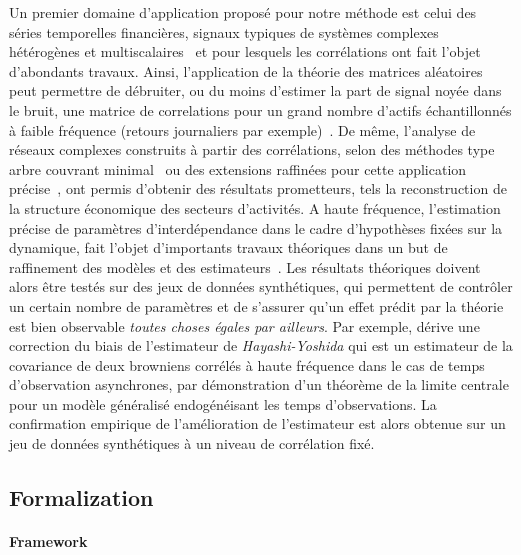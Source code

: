 {Un premier domaine d'application proposé pour notre méthode est celui des séries temporelles financières, signaux typiques de systèmes complexes hétérogènes et multiscalaires~\cite{mantegna2000introduction} et pour lesquels les corrélations ont fait l'objet d'abondants travaux. Ainsi, l'application de la théorie des matrices aléatoires peut permettre de débruiter, ou du moins d'estimer la part de signal noyée dans le bruit, une matrice de correlations pour un grand nombre d'actifs échantillonnés à faible fréquence (retours journaliers par exemple)~\cite{2009arXiv0910.1205B}. De même, l'analyse de réseaux complexes construits à partir des corrélations, selon des méthodes type arbre couvrant minimal~\cite{2001PhyA..299...16B} ou des extensions raffinées pour cette application précise~\cite{tumminello2005tool}, ont permis d'obtenir des résultats prometteurs, tels la reconstruction de la structure économique des secteurs d'activités. A haute fréquence, l'estimation précise de paramètres d'interdépendance dans le cadre d'hypothèses fixées sur la dynamique, fait l'objet d'importants travaux théoriques dans un but de raffinement des modèles et des estimateurs~\cite{barndorff2011multivariate}. Les résultats théoriques doivent alors être testés sur des jeux de données synthétiques, qui permettent de contrôler un certain nombre de paramètres et de s'assurer qu'un effet prédit par la théorie est bien observable \emph{toutes choses égales par ailleurs}. Par exemple, \cite{potiron2015estimation} dérive une correction du biais de l'estimateur de \emph{Hayashi-Yoshida} qui est un estimateur de la covariance de deux browniens corrélés à haute fréquence dans le cas de temps d'observation asynchrones, par démonstration d'un théorème de la limite centrale pour un modèle généralisé endogénéisant les temps d'observations. La confirmation empirique de l'amélioration de l'estimateur est alors obtenue sur un jeu de données synthétiques à un niveau de corrélation fixé.
}


\subsection*{Formalization}

\paragraph{Framework}


